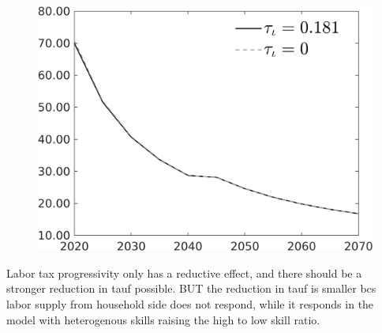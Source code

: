 \documentclass[12pt]{article}
\begin{document}
\begin{figure}[h!!]
\begin{minipage}[]{0.32\textwidth}
	\end{minipage}	
	\begin{minipage}[]{0.32\textwidth}
		\includegraphics[width=1\textwidth]{../../codding_model/own_basedOnFried/optimalPol_010922_revision/figures/all_13Sept22/CompTauf_bytaul_Reg0_gAg_spillover0_nsk1_xgr0_knspil0_sep1_LFlimit1_emsbase0_countec0_GovRev0_etaa0.79_lgd1.png}
	\end{minipage}	
\end{figure}
Labor tax progressivity only has a reductive effect, and there should be  a stronger reduction in tauf possible. BUT the reduction in tauf is smaller bcs labor supply from household side does not respond, while it responds in the model with heterogenous skills raising the high to low skill ratio. 
\end{document}
